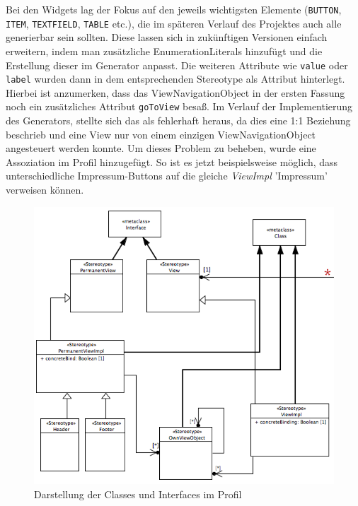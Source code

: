 Bei den Widgets lag der Fokus auf den jeweils wichtigsten Elemente (\texttt{BUTTON}, \texttt{ITEM}, \texttt{TEXTFIELD}, \texttt{TABLE} etc.), die im späteren Verlauf des Projektes auch alle generierbar sein sollten. Diese lassen sich in zukünftigen Versionen einfach erweitern, indem man zusätzliche EnumerationLiterals hinzufügt und die Erstellung dieser im Generator anpasst. Die weiteren Attribute wie \texttt{value} oder \texttt{label} wurden dann in dem entsprechenden Stereotype als Attribut hinterlegt.
Hierbei ist anzumerken, dass das ViewNavigationObject in der ersten Fassung noch ein zusätzliches Attribut \texttt{goToView} besaß. Im Verlauf der Implementierung des Generators, stellte sich das als fehlerhaft heraus, da dies eine 1:1 Beziehung beschrieb und eine View nur von einem einzigen ViewNavigationObject angesteuert werden konnte. Um dieses Problem zu beheben, wurde eine Assoziation im Profil hinzugefügt. So ist es jetzt beispielsweise möglich, dass unterschiedliche Impressum-Buttons auf die gleiche \textit{ViewImpl} 'Impressum' verweisen können. \\
\begin{figure}[ht]
\begin{center}
\includegraphics[width=\textwidth]{./img/ProfilClass.png}
\caption{Darstellung der Classes und Interfaces im Profil}\label{Fig:UMLProfilClass}
\end{center}
\end{figure}

